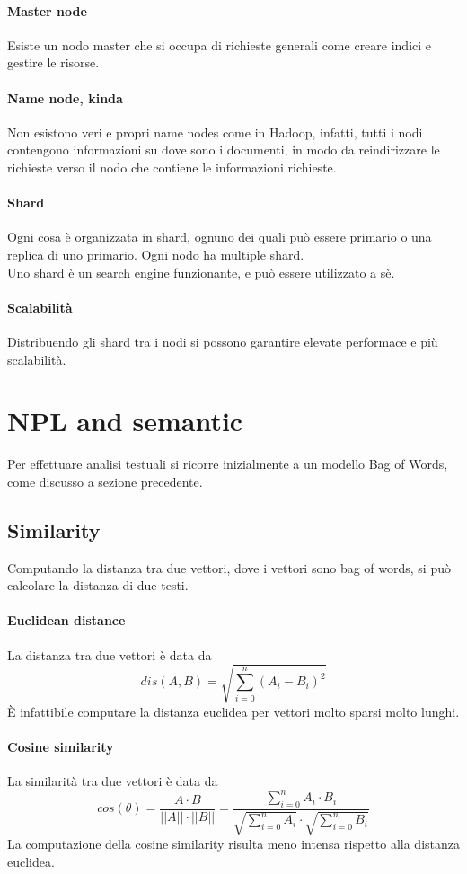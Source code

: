 \paragraph{Master node}
Esiste un nodo master che si occupa di richieste 
generali come creare indici e gestire le risorse.

\paragraph{Name node, kinda}
Non esistono veri e propri name nodes come in Hadoop, infatti, tutti i nodi contengono
informazioni su dove sono i documenti, in modo da reindirizzare le richieste verso 
il nodo che contiene le informazioni richieste.

\paragraph{Shard}
Ogni cosa è organizzata in shard, ognuno dei quali 
può essere primario o una replica di uno primario.
Ogni nodo ha multiple shard.\\
Uno shard è un search engine funzionante, e può essere utilizzato a sè.

\paragraph{Scalabilità}
Distribuendo gli shard tra i nodi si possono garantire elevate performace
e più scalabilità.

\section{NPL and semantic}
Per effettuare analisi testuali si ricorre inizialmente a un modello Bag of Words, 
come discusso a sezione precedente.

\subsection{Similarity}
Computando la distanza tra due vettori, dove i vettori sono bag of words, si può 
calcolare la distanza di due testi.

\paragraph{Euclidean distance}
La distanza tra due vettori è data da
$$
    dis(A, B) = \sqrt{\sum_{i=0}^{n} (A_i - B_i)^2}
$$
È infattibile computare la distanza euclidea per vettori molto sparsi molto lunghi.

\paragraph{Cosine similarity}
La similarità tra due vettori è data da
$$
    cos(\theta) = \frac{A \cdot B}{||A||  \cdot  ||B||} = 
    \frac{\sum_{i=0}^{n} A_i \cdot B_i}{\sqrt{\sum_{i=0}^{n} A_i}  \cdot  \sqrt{\sum_{i=0}^{n} B_i}}
$$
La computazione della cosine similarity risulta meno intensa rispetto alla distanza euclidea.